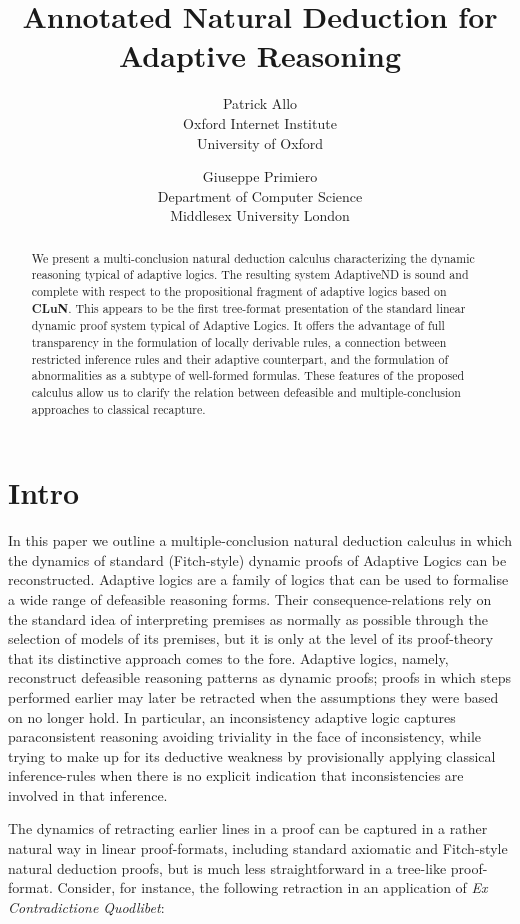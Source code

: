 \documentclass[]{article}
\title{Annotated Natural Deduction for Adaptive Reasoning}
\author{Patrick Allo\\
Oxford Internet Institute\\
University of Oxford\\
 \and Giuseppe Primiero\\
 Department of Computer Science\\
 Middlesex University London}
\date{}
\begin{document}
\maketitle

\begin{abstract}
We present a multi-conclusion natural deduction calculus characterizing the dynamic reasoning typical of adaptive logics. The resulting system {\sf AdaptiveND} is sound and complete with respect to the propositional fragment of adaptive logics based on  \textbf{CLuN}. This appears to be the first tree-format presentation of the standard linear dynamic proof system typical of Adaptive Logics. It offers the advantage of full transparency in the formulation of locally derivable rules, a connection between restricted inference rules and their adaptive counterpart, and the formulation of abnormalities as a subtype of well-formed formulas. These features of the proposed calculus allow us to clarify the relation between defeasible and multiple-conclusion approaches to classical recapture.
\end{abstract}

\section{Intro}

In this paper we outline a multiple-conclusion natural deduction calculus in which the dynamics of standard (Fitch-style) dynamic proofs of Adaptive Logics \cite{batens07} can be reconstructed. Adaptive logics are a family of logics that can be used to formalise a wide range of defeasible reasoning forms. Their consequence-relations rely on the standard idea of interpreting premises as normally as possible through the selection of models of its premises, but it is only at the level of its proof-theory that its distinctive approach comes to the fore. Adaptive logics, namely, reconstruct defeasible reasoning patterns as dynamic proofs; proofs in which steps performed earlier may later be retracted when the assumptions they were based on no longer hold.
In particular, an inconsistency adaptive logic
captures paraconsistent reasoning avoiding triviality in the face of inconsistency, while trying to make up for its deductive weakness by provisionally applying classical inference-rules when there is no explicit indication that inconsistencies are involved in that inference.

The dynamics of retracting earlier lines in a proof can be captured in a rather natural way in linear proof-formats, including standard axiomatic and Fitch-style natural deduction proofs, but is much less straightforward in a tree-like proof-format. Consider, for instance, the following retraction in an application of \emph{Ex Contradictione Quodlibet}:
\end{document}
